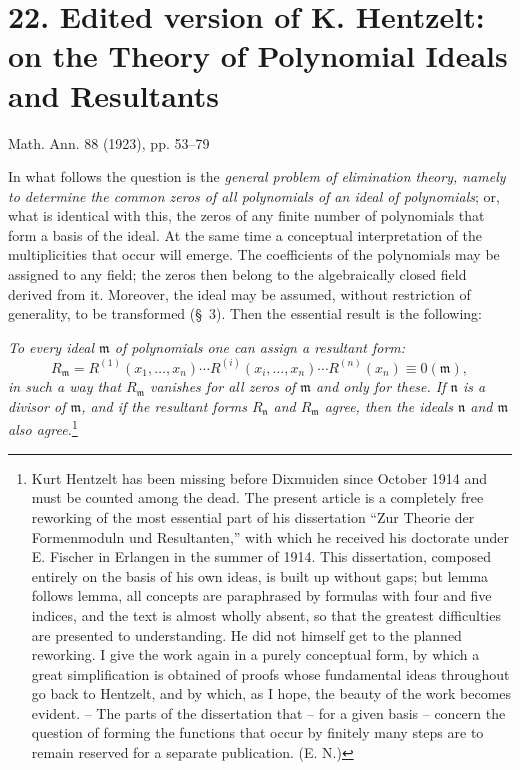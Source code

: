 \documentclass[11pt]{article}
\newcommand{\mideal}{\mathfrak m}
\newcommand{\nideal}{\mathfrak n}
\newcommand{\zero}[1]{\equiv 0(#1)}
\begin{document}
\setcounter{footnote}{0}

\section*{22. Edited version of K. Hentzelt:\\ on the Theory of Polynomial Ideals and Resultants}
\begin{center}
Math. Ann. 88 (1923), pp. 53--79
\end{center}

In what follows the question is the \emph{general problem of elimination theory, namely to determine the common zeros of all polynomials of an ideal of polynomials}; or, what is identical with this, the zeros of any finite number of polynomials that form a basis of the ideal. At the same time a conceptual interpretation of the multiplicities that occur will emerge. The coefficients of the polynomials may be assigned to any field; the zeros then belong to the algebraically closed field derived from it. Moreover, the ideal may be assumed, without restriction of generality, to be transformed (§~3). Then the essential result is the following:

\emph{To every ideal $\mideal$ of polynomials one can assign a resultant form:}
\[
 R_{\mideal}=R^{(1)}(x_1,\ldots,x_n)\cdots
 R^{(i)}(x_i,\ldots,x_n)\cdots R^{(n)}(x_n)\zero{\mideal},
\]
\emph{in such a way that $R_{\mideal}$ vanishes for all zeros of $\mideal$ and only for these. If $\nideal$ is a divisor of $\mideal$, and if the resultant forms $R_{\nideal}$ and $R_{\mideal}$ agree, then the ideals $\nideal$ and $\mideal$ also agree.}\footnote{Kurt Hentzelt has been missing before Dixmuiden since October 1914 and must be counted among the dead. The present article is a completely free reworking of the most essential part of his dissertation ``Zur Theorie der Formenmoduln und Resultanten,'' with which he received his doctorate under E. Fischer in Erlangen in the summer of 1914. This dissertation, composed entirely on the basis of his own ideas, is built up without gaps; but lemma follows lemma, all concepts are paraphrased by formulas with four and five indices, and the text is almost wholly absent, so that the greatest difficulties are presented to understanding. He did not himself get to the planned reworking. I give the work again in a purely conceptual form, by which a great simplification is obtained of proofs whose fundamental ideas throughout go back to Hentzelt, and by which, as I hope, the beauty of the work becomes evident. -- The parts of the dissertation that -- for a given basis -- concern the question of forming the functions that occur by finitely many steps are to remain reserved for a separate publication. (E. N.)}
\end{document}
